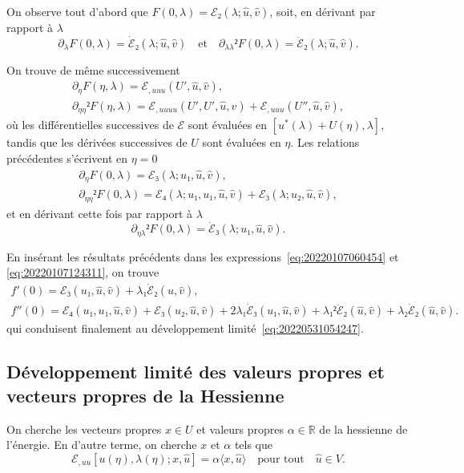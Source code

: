\documentclass[12pt, final]{scrartcl}
\theoremstyle{definition}
\newcommand{\reals}{\mathbb{R}}
\begin{document}
On observe tout d'abord que \(F(0, λ) =ℰ₂(λ; \hat{u}, \hat{v})\), soit, en
dérivant par rapport à \(λ\)
\begin{equation*}
  ∂_{λ} F(0, λ) = \dot{ℰ}₂(λ; \hat{u}, \hat{v})
  \quad \text{et} \quad
  ∂_{λλ}² F(0, λ) = \ddot{ℰ}₂(λ; \hat{u}, \hat{v}).
\end{equation*}

On trouve de même successivement
\begin{gather*}
  ∂_{η} F(η, λ) = ℰ_{, uuu}(U', \hat{u}, \hat{v}),\\
  ∂_{ηη}² F(η, λ) = ℰ_{, uuuu}(U', U', \hat{u}, \hat{v}) + ℰ_{, uuu}(U'', \hat{u}, \hat{v}),
\end{gather*}
où les différentielles successives de \(ℰ\) sont évaluées en
\([u^{\ast}(λ) + U(η), λ]\), tandis que les dérivées successives de \(U\) sont
évaluées en \(η\). Les relations précédentes s'écrivent en \(η = 0\)
\begin{gather*}
  ∂_{η} F(0, λ) = ℰ₃(λ; u₁, \hat{u}, \hat{v}),\\
  ∂_{ηη}² F(0, λ) = ℰ₄(λ ; u₁, u₁, \hat{u}, \hat{v}) + ℰ₃(λ; u₂, \hat{u}, \hat{v}),
\end{gather*}
et en dérivant cette fois par rapport à \(λ\)
\begin{equation*}
  ∂_{η λ}² F(0, λ) = \dot{ℰ}₃(λ; u₁, \hat{u}, \hat{v}).
\end{equation*}

En insérant les résultats précédents dans les
expressions~\eqref{eq:20220107060454} et \eqref{eq:20220107124311}, on trouve
\begin{gather*}
  f'(0) = ℰ₃(u₁, \hat{u}, \hat{v}) + λ₁ \dot{ℰ}₂(\hat{u}, \hat{v}),\\
  f''(0) = ℰ₄(u₁, u₁, \hat{u}, \hat{v}) + ℰ₃(u₂, \hat{u}, \hat{v}) + 2λ₁ \dot{ℰ}₃(u₁, \hat{u}, \hat{v}) + λ₁² \ddot{ℰ}₂(\hat{u}, \hat{v}) + λ₂ \dot{ℰ}₂(\hat{u}, \hat{v}) .
\end{gather*}
qui conduisent finalement au développement limité~\eqref{eq:20220531054247}.

\subsection{Développement limité des valeurs propres et vecteurs
propres de la Hessienne}

On cherche les vecteurs propres \(x ∈ U\) et valeurs propres \(α ∈ \reals\) de
la hessienne de l'énergie. En d'autre terme, on cherche \(x\) et \(α\) tels que
\begin{equation}
 ℰ_{, u u} [u(η), λ(η); x, \hat{u}] = α 〈 x, \hat{u} 〉 \quad \text{pour tout} \quad \hat{u} ∈ V.
\end{equation}
\end{document}

